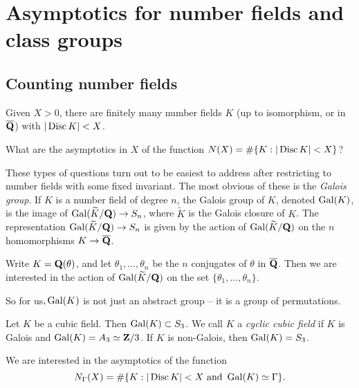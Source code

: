 
\section{Asymptotics for number fields and class groups}





\subsection{Counting number fields}

\begin{theorem}[Hermite]
Given $X>0$, there are finitely many number fields $K$ (up to isomorphism, or 
in $\overline{\mathbf{Q}}$) with $|\operatorname{Disc} K|<X$. 
\end{theorem}

\begin{question}
What are the asymptotics in $X$ of the function 
$N(X)=\#\{K:|\operatorname{Disc} K|<X\}$?
\end{question}

These types of questions turn out to be easiest to address after restricting to 
number fields with some fixed invariant. The most obvious of these is the 
\emph{Galois group}. If $K$ is a number field of degree $n$, the Galois group 
of $K$, denoted $\operatorname{Gal}(K)$, is the image of $\operatorname{Gal}(\widetilde K/\mathbf{Q}) \to S_n$, where 
$\tilde K$ is the Galois closure of $K$. The representation 
$\operatorname{Gal}(\widetilde K/\mathbf{Q}) \to S_n$ is given by the action of $\operatorname{Gal}(\widetilde K/\mathbf{Q})$ on 
the $n$ homomorphisms $K\to \overline{\mathbf{Q}}$. 

\begin{example}
Write $K=\mathbf{Q}(\theta)$, and let $\theta_1,\dots,\theta_n$ be the $n$ conjugates 
of $\theta$ in $\overline{\mathbf{Q}}$. Then we are interested in the action of 
$\operatorname{Gal}(\widetilde K/\mathbf{Q})$ on the set $\{\theta_1,\dots,\theta_n\}$. 
\end{example}

So for us$, \operatorname{Gal}(K)$ is not just an abstract group -- it is a group of 
permutations.  

\begin{example}
Let $K$ be a cubic field. Then $\operatorname{Gal}(K)\subset S_3$. We call $K$ a \emph{cyclic 
cubic field} if $K$ is Galois and $\operatorname{Gal}(K)=A_3\simeq \mathbf{Z}/3$. If $K$ is 
non-Galois, then $\operatorname{Gal}(K)=S_3$. 
\end{example}

We are interested in the asymptotics of the function 
\[
  N_\Gamma(X) = \#\{K:|\operatorname{Disc} K|<X\text{ and }\operatorname{Gal}(K)\simeq \Gamma\} .
\]





